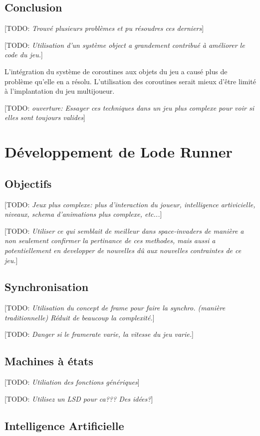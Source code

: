 \documentclass[12pt,oneside,letterpaper,francais]{book}
\newcommand{\todo}[1]{[TODO: {\it #1}]}
\begin{document}
\subsection{Conclusion}
\todo{Trouvé plusieurs problèmes et pu résoudres ces derniers}

\todo{Utilisation d'un système object a grandement contribué à
  améliorer le code du jeu.}

L'intégration du système de coroutines aux objets du jeu a causé plus
de problème qu'elle en a résolu. L'utilisation des coroutines serait
mieux d'être limité à l'implantation du jeu multijoueur.

\todo{ouverture: Essayer ces techniques dans un jeu plus complexe pour
  voir si elles sont toujours valides}


\section{Développement de \og Lode Runner \fg}
\subsection{Objectifs}
\todo{Jeux plus complexe: plus d'interaction du joueur, intelligence
  artivicielle, niveaux, schema d'animations plus complexe, etc...}

\todo{Utiliser ce qui semblait de meilleur dans space-invaders de
  manière a non seulement confirmer la pertinance de ces methodes,
  mais aussi a potentiellement en developper de nouvelles dû aux
  nouvelles contraintes de ce jeu.}

\subsection{Synchronisation}
\todo{Utilisation du concept de frame pour faire la synchro. (manière
  traditionnelle) Réduit de beaucoup la complexité.}

\todo{Danger si le framerate varie, la vitesse du jeu varie.}

\subsection{Machines à états}
\todo{Utiliation des fonctions génériques}

\todo{Utilisez un LSD pour ca??? Des idées?}

\subsection{Intelligence Artificielle}
\end{document}
